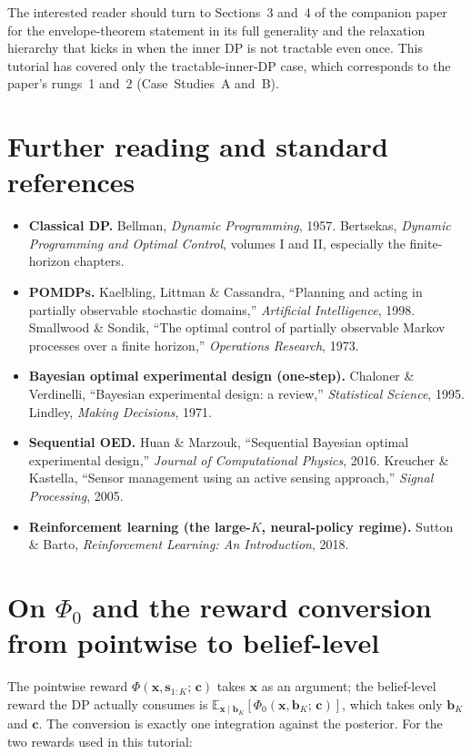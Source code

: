 \documentclass[11pt]{article}
\newcommand{\bc}{\bm{c}}
\newcommand{\bx}{\bm{x}}
\newcommand{\bs}{\bm{s}}
\newcommand{\bb}{\bm{b}}
\newcommand{\E}{\mathbb{E}}
\begin{document}
\bigskip

The interested reader should turn to Sections~3 and~4 of the companion paper for the envelope-theorem statement in its full generality and the relaxation hierarchy that kicks in when the inner DP is not tractable even once.  This tutorial has covered only the tractable-inner-DP case, which corresponds to the paper's rungs~1 and~2 (Case~Studies~A and~B).

\section{Further reading and standard references}
\label{sec:reading}

\begin{itemize}[nosep, leftmargin=*]
\item \textbf{Classical DP.}  Bellman, \emph{Dynamic Programming}, 1957.  Bertsekas, \emph{Dynamic Programming and Optimal Control}, volumes I and II, especially the finite-horizon chapters.
\item \textbf{POMDPs.}  Kaelbling, Littman \& Cassandra, ``Planning and acting in partially observable stochastic domains,'' \emph{Artificial Intelligence}, 1998.  Smallwood \& Sondik, ``The optimal control of partially observable Markov processes over a finite horizon,'' \emph{Operations Research}, 1973.
\item \textbf{Bayesian optimal experimental design (one-step).}  Chaloner \& Verdinelli, ``Bayesian experimental design: a review,'' \emph{Statistical Science}, 1995.  Lindley, \emph{Making Decisions}, 1971.
\item \textbf{Sequential OED.}  Huan \& Marzouk, ``Sequential Bayesian optimal experimental design,'' \emph{Journal of Computational Physics}, 2016.  Kreucher \& Kastella, ``Sensor management using an active sensing approach,'' \emph{Signal Processing}, 2005.
\item \textbf{Reinforcement learning (the large-$K$, neural-policy regime).}  Sutton \& Barto, \emph{Reinforcement Learning: An Introduction}, 2018.
\end{itemize}

\appendix

\section{On \texorpdfstring{$\Phi_0$}{Phi\_0} and the reward conversion from pointwise to belief-level}
\label{app:phi0}

The pointwise reward $\Phi(\bx, \bs_{1:K};\, \bc)$ takes $\bx$ as an argument; the belief-level reward the DP actually consumes is $\E_{\bx \mid \bb_K}[\Phi_0(\bx, \bb_K;\, \bc)]$, which takes only $\bb_K$ and $\bc$.  The conversion is exactly one integration against the posterior.  For the two rewards used in this tutorial:
\end{document}
